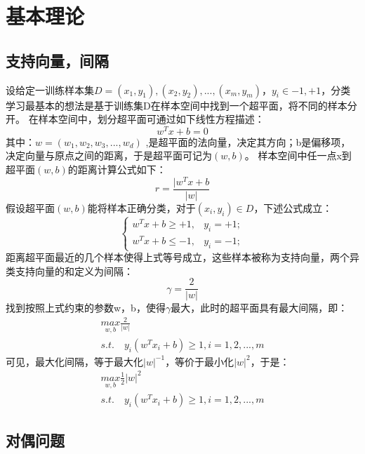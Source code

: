 \chapter{基本理论}
\section{支持向量，间隔}
设给定一训练样本集$D={(x_1,y_1), (x_2,y_2), ..., (x_m,y_m)}$，$y_i \in {-1,+1}$，分类学习最基本的想法是基于训练集D在样本空间中找到一个超平面，将不同的样本分开。
在样本空间中，划分超平面可通过如下线性方程描述：
$$ w^Tx+b=0 $$
其中：$w=(w_1,w_2,w_3, ..., w_d)$ ,是超平面的法向量，决定其方向；b是偏移项，决定向量与原点之间的距离，于是超平面可记为$(w,b)$。
样本空间中任一点x到超平面$(w,b)$的距离计算公式如下：
$$ r = \frac{|w^Tx+b}{|w|} $$
假设超平面$(w,b)$能将样本正确分类，对于$(x_i,y_i) \in D$，下述公式成立：
$$
\begin{cases}
    w^Tx+b \geqslant +1,& y_i=+1; \\
    w^Tx+b \leqslant -1,& y_i=-1;
\end{cases}
$$
距离超平面最近的几个样本使得上式等号成立，这些样本被称为支持向量，两个异类支持向量的和定义为间隔：
$$ \gamma = \frac{2}{|w|} $$
找到按照上式约束的参数w，b，使得$\gamma$最大，此时的超平面具有最大间隔，即：
$$
\begin{matrix}
    \underset{w,b}{max} \frac{2}{|w|} \\
    s.t. \quad y_i(w^Tx_i+b) \geqslant 1, i=1,2,...,m
\end{matrix}
$$
可见，最大化间隔，等于最大化$|w|^{-1}$，等价于最小化$|w|^2$，于是：
$$
\begin{matrix}
    \underset{w,b}{max}{\frac{1}{2}|w|^2} \\
    s.t. \quad y_i(w^Tx_i+b) \geqslant 1, i=1,2,...,m
\end{matrix}
$$

\section{对偶问题}

